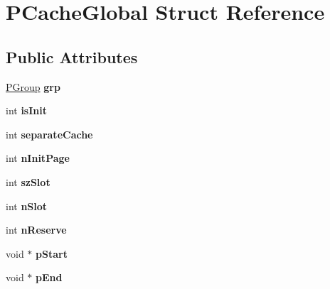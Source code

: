 \hypertarget{struct_p_cache_global}{}\section{P\+Cache\+Global Struct Reference}
\label{struct_p_cache_global}
\subsection*{Public Attributes}
\begin{DoxyCompactItemize}
\item 
\mbox{\label{struct_p_cache_global_a0b05c7641a431aeed1ea24f99ab2ecd7}} 
\mbox{\hyperlink{struct_p_group}{P\+Group}} {\bfseries grp}
\item 
\mbox{\label{struct_p_cache_global_ae0e2bc49e28b9f0cf53c7e1a01c41bc4}} 
int {\bfseries is\+Init}
\item 
\mbox{\label{struct_p_cache_global_a10d40772c985cc20e6fdd3d49ee7e5f9}} 
int {\bfseries separate\+Cache}
\item 
\mbox{\label{struct_p_cache_global_a795a183edd692396de9386900f7ee6d0}} 
int {\bfseries n\+Init\+Page}
\item 
\mbox{\label{struct_p_cache_global_acaac974ff5d639fd41bd4ba209192981}} 
int {\bfseries sz\+Slot}
\item 
\mbox{\label{struct_p_cache_global_a99bf99dc34047fafaa7045483e91097a}} 
int {\bfseries n\+Slot}
\item 
\mbox{\label{struct_p_cache_global_aa3e1433dba1b860b14db27c00b169acf}} 
int {\bfseries n\+Reserve}
\item 
\mbox{\label{struct_p_cache_global_abba42637dea7324713e5329a7216cdec}} 
void $\ast$ {\bfseries p\+Start}
\item 
\mbox{\label{struct_p_cache_global_aec236718debd15bfeedec210978c338b}} 
void $\ast$ {\bfseries p\+End}
\item 
\mbox{\label{struct_p_cache_global_a50443ccdade1651a94b63cdea1bcb966}} 

\end{DoxyCompactItemize}
